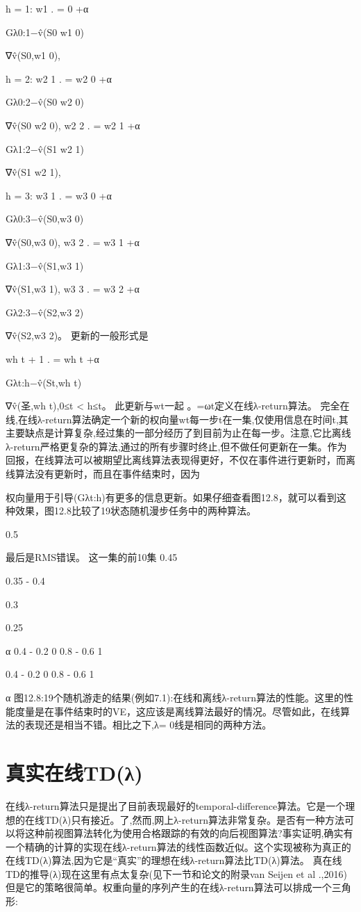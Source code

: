 h = 1: w1
.
= 0 +α

Gλ0:1−v̂(S0 w1 0)

∇v̂(S0,w1 0),

h = 2: w2 1
.
= w2 0 +α

Gλ0:2−v̂(S0 w2 0)

∇v̂(S0 w2 0),
w2 2
.
= w2 1 +α

Gλ1:2−v̂(S1 w2 1)

∇v̂(S1 w2 1),

h = 3: w3 1
.
= w3 0 +α

Gλ0:3−v̂(S0,w3 0)

∇v̂(S0,w3 0),
w3 2
.
= w3 1 +α

Gλ1:3−v̂(S1,w3 1)

∇v̂(S1,w3 1),
w3 3
.
= w3 2 +α

Gλ2:3−v̂(S2,w3 2)

∇v̂(S2,w3 2)。
更新的一般形式是

wh t + 1
.
= wh t +α

Gλt:h−v̂(St,wh t)

∇v̂(圣,wh t),0≤t < h≤t。
此更新与wt一起
。=ωt定义在线λ-return算法。
完全在线,在线λ-return算法确定一个新的权向量wt每一步t在一集,仅使用信息在时间t,其主要缺点是计算复杂,经过集的一部分经历了到目前为止在每一步。注意,它比离线λ-return严格更复杂的算法,通过的所有步骤时终止,但不做任何更新在一集。作为回报，在线算法可以被期望比离线算法表现得更好，不仅在事件进行更新时，而离线算法没有更新时，而且在事件结束时，因为

权向量用于引导(Gλt:h)有更多的信息更新。如果仔细查看图12.8，就可以看到这种效果，图12.8比较了19状态随机漫步任务中的两种算法。
 
0.5


最后是RMS错误。
这一集的前10集
0.45




0.35 - 0.4




0.3



0.25



α
0.4 - 0.2 0 					0.8 - 0.6 					1
 
0.4 - 0.2 0 					0.8 - 0.6 					1

α
图12.8:19个随机游走的结果(例如7.1):在线和离线λ-return算法的性能。这里的性能度量是在事件结束时的VE，这应该是离线算法最好的情况。尽管如此，在线算法的表现还是相当不错。相比之下,λ= 0线是相同的两种方法。


\section{真实在线TD(λ)}
在线λ-return算法只是提出了目前表现最好的temporal-difference算法。它是一个理想的在线TD(λ)只有接近。了,然而,网上λ-return算法非常复杂。是否有一种方法可以将这种前视图算法转化为使用合格跟踪的有效的向后视图算法?事实证明,确实有一个精确的计算的实现在线λ-return算法的线性函数近似。这个实现被称为真正的在线TD(λ)算法,因为它是“真实”的理想在线λ-return算法比TD(λ)算法。
真在线TD的推导(λ)现在这里有点太复杂(见下一节和论文的附录van Seijen et al .,2016)但是它的策略很简单。权重向量的序列产生的在线λ-return算法可以排成一个三角形:


